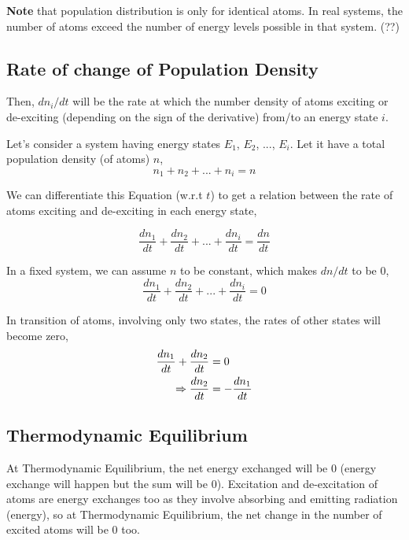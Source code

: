 \documentclass[12pt]{article}
\begin{document}
\textbf{Note} that population distribution is only for identical atoms. In real systems, the number of atoms exceed the number of energy levels possible in that system. (??)

\subsection{Rate of change of Population Density}

Then, $dn_{i}/dt$ will be the rate at which the number density of atoms exciting or de-exciting (depending on the sign of the derivative) from/to an energy state $i$. \vspace{.2cm}

Let's consider a system having energy states $E_{1}$, $E_{2}$, ..., $E_{i}$. Let it have a total population density (of atoms) $n$,
\begin{equation}
    n_{1} + n_{2} + ... + n_{i} = n
\end{equation}

We can differentiate this Equation (w.r.t $t$) to get a relation between the rate of atoms exciting and de-exciting in each energy state,

\begin{equation*}
    \frac{dn_{1}}{dt} + \frac{dn_{2}}{dt} + ... + \frac{dn_{i}}{dt} = \frac{dn}{dt}
\end{equation*}

In a fixed system, we can assume $n$ to be constant, which makes $dn/dt$ to be 0,
\begin{equation*}
    \frac{dn_{1}}{dt} + \frac{dn_{2}}{dt} + ... + \frac{dn_{i}}{dt} = 0
\end{equation*} 

In transition of atoms, involving only two states, the rates of other states will become zero,
\begin{align}
    \frac{dn_{1}}{dt} + \frac{dn_{2}}{dt} & = 0 \notag \\
    \Rightarrow \frac{dn_{2}}{dt} & = -\frac{dn_{1}}{dt}
\end{align}

\subsection{Thermodynamic Equilibrium}

At Thermodynamic Equilibrium, the net energy exchanged will be 0 (energy exchange will happen but the sum will be 0). Excitation and de-excitation of atoms are energy exchanges too as they involve absorbing and emitting radiation (energy), so at Thermodynamic Equilibrium, the net change in the number of excited atoms will be 0 too. \vspace{.2cm}
\end{document}
